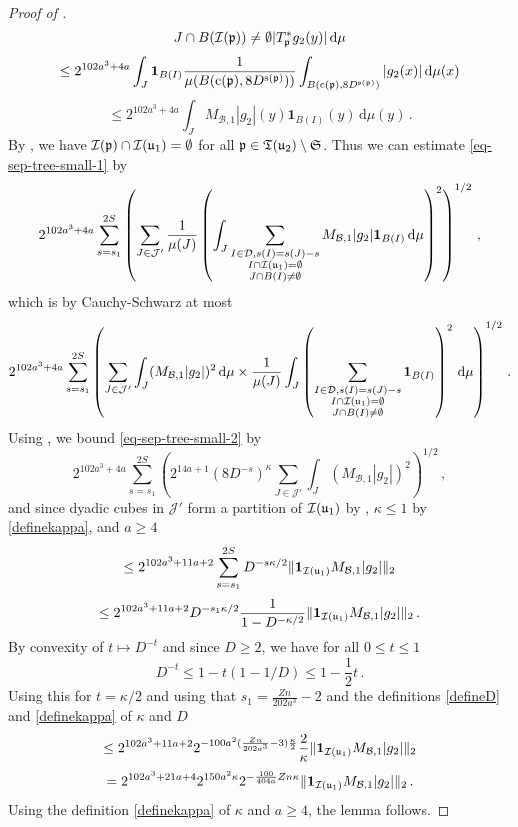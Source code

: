 \begin{proof}[Proof of ]
$${{        J \cap B({\mathcal{I}}({\mathfrak p})) \ne \emptyset}} |T_{{\mathfrak p}}^* g_2(y)| \, \mathrm{d}\mu
    $$
    $$
        \le 2^{102a^3+4a} \int_J \mathbf{1}_{B(I)} \frac{1}{\mu(B({\mathrm{c}}({\mathfrak p}), 8D^{{\mathrm{s}}({\mathfrak p})}))} \int_{B({\mathrm{c}}({\mathfrak p}), 8D^{{\mathrm{s}}({\mathfrak p})})} |g_2(x)| \, \mathrm{d}\mu(x)
    $$
    $$
        \le 2^{102a^3+4a} \int_J M_{\mathcal{B},1} |g_2|(y) \mathbf{1}_{B(I)}(y) \, \mathrm{d}\mu(y)\,.
    $$
    By , we have ${\mathcal{I}}({\mathfrak p}) \cap {\mathcal{I}}({\mathfrak u}_1) = \emptyset$ for all ${\mathfrak p} \in {\mathfrak T}({\mathfrak u}_2) \setminus \mathfrak{S}$.
    Thus we can estimate \eqref{eq-sep-tree-small-1} by
    $$
        2^{102a^3+4a} \sum_{s=s_1}^{2S} \left( \sum_{J \in \mathcal{J}'} \frac{1}{\mu(J)} \left(\int_J \sum_{\substack{I \in \mathcal{D}, s(I) = s(J) - s\\ I \cap {\mathcal{I}}({\mathfrak u}_1) = \emptyset\\
        J \cap B(I) \ne \emptyset}} M_{\mathcal{B},1} |g_2| \mathbf{1}_{B(I)} \, \mathrm{d}\mu \right)^2\right)^{1/2}\,,
    $$
    which is by Cauchy-Schwarz at most
    \begin{equation}
    \label{eq-sep-tree-small-2}
        2^{102a^3+4a} \sum_{s=s_1}^{2S} \left( \sum_{J \in \mathcal{J}'} \int_J ( M_{\mathcal{B},1} |g_2|)^2 \, \mathrm{d}\mu \times
        \frac{1}{\mu(J)} \int_J \left(\sum_{\substack{I \in \mathcal{D}, s(I) = s(J) - s\\ I \cap {\mathcal{I}}({\mathfrak u}_1) = \emptyset\\
        J \cap B(I) \ne \emptyset}} \mathbf{1}_{B(I)}\right)^2 \, \mathrm{d}\mu \right)^{1/2}\,.
    \end{equation}
    Using , we bound \eqref{eq-sep-tree-small-2} by
    $$
        2^{102a^3+4a} \sum_{s=s_1}^{2S} \left(2^{14a+1} (8 D^{-s})^\kappa \sum_{J \in \mathcal{J}'} \int_J (M_{\mathcal{B},1} |g_2|)^2\right)^{1/2}\,,
    $$
    and since dyadic cubes in $\mathcal{J}'$ form a partition of ${\mathcal{I}}({\mathfrak u}_1)$ by , $\kappa \le 1$ by \eqref{definekappa}, and $a \ge 4$
    $$
        \le 2^{102a^3+11a+2} \sum_{s=s_1}^{2S} D^{-s\kappa/2} \|\mathbf{1}_{{\mathcal{I}}({\mathfrak u}_1)} M_{\mathcal{B},1} |g_2|\|_2
    $$
    $$
        \le 2^{102a^3+11a+2} D^{-s_1 \kappa /2} \frac{1}{1 - D^{-\kappa/2}} \|\mathbf{1}_{{\mathcal{I}}({\mathfrak u}_1)} M_{\mathcal{B},1} |g_2|\|_2\,.
    $$
    By convexity of $t \mapsto D^{-t}$ and since $D \ge 2$, we have for all $0 \le t \le 1$
    $$
        D^{-t} \le 1 - t(1 - 1/D) \le 1 - \frac{1}{2}t\,.
    $$
    Using this for $t = \kappa/2$ and using that $s_1 = \frac{Zn}{202a^3} - 2$ and the definitions \eqref{defineD} and \eqref{definekappa} of $\kappa$ and $D$
    $$
        \le 2^{102a^3+11a+2} 2^{-100a^2(\frac{Zn}{202a^3} - 3) \frac{\kappa}{2}} \frac{2}{\kappa} \|\mathbf{1}_{{\mathcal{I}}({\mathfrak u}_1)} M_{\mathcal{B},1} |g_2|\|_2
    $$
    $$
        = 2^{102a^3+21a+4} 2^{150a^2\kappa} 2^{-\frac{100}{404a}Zn\kappa} \|\mathbf{1}_{{\mathcal{I}}({\mathfrak u}_1)} M_{\mathcal{B},1} |g_2|\|_2\,.
    $$
    Using the definition \eqref{definekappa} of $\kappa$ and $a \ge 4$, the lemma follows.
\end{proof}



